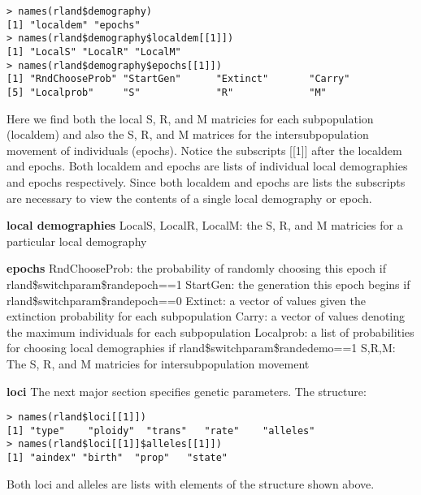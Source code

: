 \documentclass{article}
\begin{document}
\begin{list}{}{\setlength{\labelsep}{10pt} \setlength{\leftmargin}{40pt}}
\begin{verbatim}
> names(rland$demography)
[1] "localdem" "epochs"
> names(rland$demography$localdem[[1]])
[1] "LocalS" "LocalR" "LocalM"
> names(rland$demography$epochs[[1]])
[1] "RndChooseProb" "StartGen"      "Extinct"       "Carry"
[5] "Localprob"     "S"             "R"             "M"
\end{verbatim}

Here we find both the local S, R, and M matricies for each subpopulation (localdem) and also the S, R, and M matrices for the intersubpopulation movement of individuals (epochs).  Notice the subscripts [[1]] after the localdem and epochs.  Both localdem and epochs are lists of individual local demographies and epochs respectively.  Since both localdem and epochs are lists the subscripts are necessary to view the contents of a single local demography or epoch.

\raggedright
\textbf{local demographies}\linebreak
LocalS, LocalR, LocalM: the S, R, and M matricies for a particular local demography

\textbf{epochs}\linebreak
RndChooseProb: the probability of randomly choosing this epoch if rland\$switchparam\$randepoch==1\linebreak
StartGen: the generation this epoch begins if rland\$switchparam\$randepoch==0\linebreak
Extinct: a vector of values given the extinction probability for each subpopulation\linebreak
Carry: a vector of values denoting the maximum individuals for each subpopulation\linebreak
Localprob: a list of probabilities for choosing local demographies if rland\$switchparam\$randedemo==1\linebreak
S,R,M: The S, R, and M matricies for intersubpopulation movement\linebreak
\sloppy
\raggedright
\item[\textbf{loci}] The next major section specifies genetic parameters.  The structure:

\begin{verbatim}
> names(rland$loci[[1]])
[1] "type"    "ploidy"  "trans"   "rate"    "alleles"
> names(rland$loci[[1]]$alleles[[1]])
[1] "aindex" "birth"  "prop"   "state"
\end{verbatim}

Both loci and alleles are lists with elements of the structure shown above.


\end{list}
\end{document}
